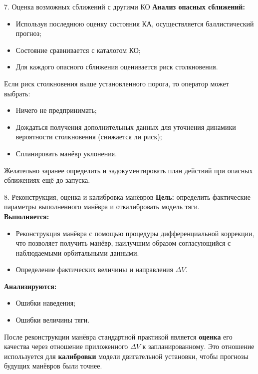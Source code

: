 \documentclass[8pt]{beamer}
\begin{document}
\begin{frame}{7. Оценка возможных сближений с другими КО}
\textbf{Анализ опасных сближений:}
\begin{itemize}
    \item Используя последнюю оценку состояния КА, осуществляется баллистический прогноз;
    \item Состояние сравнивается с каталогом КО;
    \item Для каждого опасного сближения оценивается риск столкновения.
\end{itemize}
Если риск столкновения выше установленного порога, то оператор может выбрать:
\begin{itemize}
    \item Ничего не предпринимать;
    \item Дождаться получения дополнительных данных для уточнения динамики вероятности столкновения (снижается ли риск);
    \item Спланировать манёвр уклонения.
\end{itemize}
Желательно заранее определить и задокументировать план действий при опасных сближениях ещё до запуска.
\end{frame}

\begin{frame}{8. Реконструкция, оценка и калибровка манёвров}
\textbf{Цель:} определить фактические параметры выполненного манёвра и откалибровать модель тяги. \\
\textbf{Выполняется:}
\begin{itemize}
    \item Реконструкция манёвра с помощью процедуры дифференциальной коррекции, что позволяет получить манёвр, наилучшим образом согласующийся с наблюдаемыми орбитальными данными.
    \item Определение фактических величины и направления $\Delta V$.
\end{itemize}
\textbf{Анализируются:}
\begin{itemize}
    \item Ошибки наведения;
    \item Ошибки величины тяги.
\end{itemize}
После реконструкции манёвра стандартной практикой является \textbf{оценка} его качества через отношение приложенного $\Delta V$ к запланированному. Это отношение используется для \textbf{калибровки} модели двигательной установки, чтобы прогнозы будущих манёвров были точнее.
\end{frame}
\end{document}
